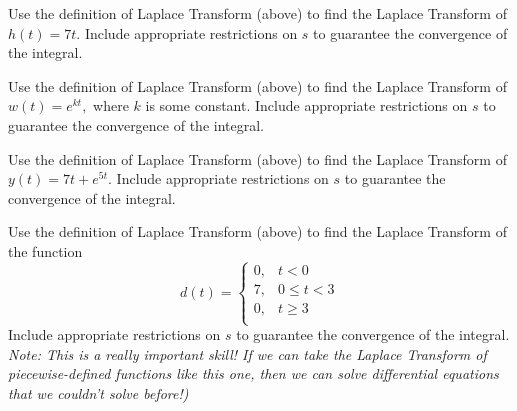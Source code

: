 \begin{DEPP}
\item    Use the definition of Laplace Transform (above) to find the Laplace Transform of $h(t) = 7t.$
 Include appropriate restrictions on $s$ to guarantee the convergence of the integral.\\

\item    Use the definition of Laplace Transform (above) to find the Laplace Transform of $w(t) = e^{kt},$
 where $k$ is some constant.  Include appropriate restrictions on $s$ to guarantee the
 convergence of the integral.\\

\item   Use the definition of Laplace Transform (above) to find the Laplace Transform of $y(t) = 7t + e^{5t}.$
  Include appropriate restrictions on $s$ to guarantee the convergence of the integral.\\

\item  Use the definition of Laplace Transform (above) to find the Laplace Transform of  the function
 \[d(t) = \left\{ \begin{array}{ll} 0, & t<0\\
       7, & 0 \le t < 3\\
       0, & t \ge 3\\
       \end{array} \right.\]  %
 Include appropriate restrictions on $s$ to guarantee the convergence of the integral.\\

 {\it Note:  This is a really important skill!  If we can take the Laplace Transform of
 piecewise-defined functions like this one, then we can solve differential equations that
 we couldn't solve before!)}\\
%
%

\end{DEPP}
\newpage
